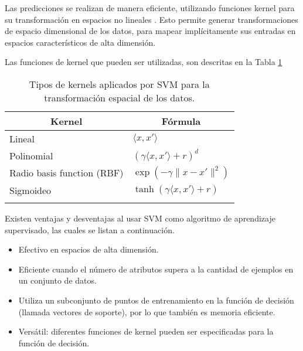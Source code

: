 Las predicciones se realizan de manera eficiente, utilizando funciones kernel para su transformación en espacios no lineales \cite{amari1999improving}. Esto permite generar transformaciones de espacio dimensional de los datos, para mapear implícitamente sus entradas en espacios característicos de alta dimensión. 

Las funciones de kernel que pueden ser utilizadas, son descritas en la Tabla \ref{tab:tab-kernel}

\begin{longtable}[c]{|l|l|}
	\hline
	\multicolumn{1}{|c|}{\textbf{Kernel}} & \multicolumn{1}{c|}{\textbf{Fórmula}}   \\ \hline
	\endfirsthead
	\endhead
	Lineal                                & $\langle x, x'\rangle$                  \\ \hline
	Polinomial                            & $(\gamma \langle x, x'\rangle + r)^d$   \\ \hline
	Radio basis function (RBF)            & $\exp(-\gamma \|x-x'\|^2)$              \\ \hline
	Sigmoideo                             & $\tanh(\gamma \langle x,x'\rangle + r)$ \\ \hline
	\caption{Tipos de kernels aplicados por SVM para la transformación espacial de los datos.
	}
	\label{tab:tab-kernel}\\
\end{longtable}

Existen ventajas y desventajas al usar SVM como algoritmo de aprendizaje supervisado, las cuales se listan a continuación.

\begin{itemize}
	
	\item Efectivo en espacios de alta dimensión.
	\item Eficiente cuando el número de atributos supera a la cantidad de ejemplos en un conjunto de datos.
	\item Utiliza un subconjunto de puntos de entrenamiento en la función de decisión (llamada
	vectores de soporte), por lo que también es memoria eficiente.
	\item Versátil: diferentes funciones de kernel pueden ser especificadas para la función de decisión. 
	
\end{itemize}

